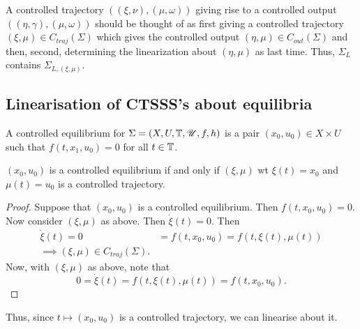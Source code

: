 A controlled trajectory $\left( \left( \xi, \nu \right) , \left( \mu, \omega \right)  \right) $ giving rise to a controlled output $\left( \left( \eta, \gamma \right) , \left( \mu, \omega \right)  \right) $ should be thought of as first giving a controlled trajectory $\left( \xi, \mu \right) \in C_{traj}\left( \Sigma \right) $ which gives the controlled output $\left( \eta, \mu \right) \in C_{out}\left( \Sigma \right) $ and then, second, determining the linearization about $\left( \eta, \mu \right) $ as last time. Thus, $\Sigma_{L}$ contains $\Sigma_{L, \left( \xi, \mu \right) }$.

\subsection{Linearisation of CTSSS's about equilibria}

\begin{definition}
	A controlled equilibrium for $\Sigma = \left( X, U, \mathbb{T} , \mathscr{U}, f, h \right) $ is a pair $\left( x_0, u_0 \right) \in X \times  U$ such that $f\left( t, x_1, u_0 \right) = 0$ for all $t \in  \mathbb{T} $. 
\end{definition}

\begin{note}
	$\left( x_0, u_0 \right) $ is a controlled equilibrium if and only if $\left( \xi, \mu \right) $ wt $\xi\left( t \right) = x_0$ and $\mu\left( t \right) = u_0$ is a controlled trajectory. 
	\begin{proof}
		Suppose that $\left( x_0, u_0 \right) $ is a controlled equilibrium. Then $f\left( t, x_0, u_0 \right) = 0$. Now consider $\left( \xi, \mu \right) $ as above. Then $\dot{\xi} \left( t \right) = 0$. Then 
		\begin{align*}
			\dot{\xi}\left( t \right) = 0 &= f\left( t, x_0, u_0 \right) = f\left( t, \xi\left( t \right) , \mu\left( t \right)  \right) \\
			\implies \left( \xi, \mu \right) \in C_{traj}\left( \Sigma \right) 
		.\end{align*}
		Now, with $\left( \xi, \mu \right) $ as above, note that 
		 \[
			 0 = \dot{\xi}\left( t \right) = f\left( t, \xi\left( t \right) , \mu\left( t \right)  \right) = f\left( t, x_0, u_0 \right) 
		.\] 
	\end{proof}
	Thus, since $t \longmapsto \left( x_0, u_0 \right) $ is a controlled trajectory, we can linearise about it.
\end{note}

